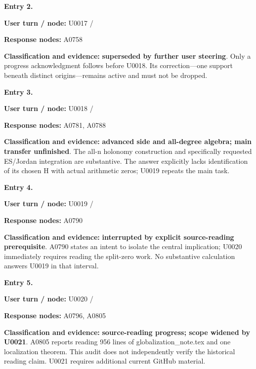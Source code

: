 
\textbf{Entry 2.}

\textbf{User turn / node:} U0017 /
\protect{}

\textbf{Response nodes:} A0758

\textbf{Classification and evidence:} \textbf{superseded by further user
steering}. Only a progress acknowledgment follows before U0018. Its
correction---one support beneath distinct origins---remains active and
must not be dropped.


\textbf{Entry 3.}

\textbf{User turn / node:} U0018 /
\protect{}

\textbf{Response nodes:} A0781, A0788

\textbf{Classification and evidence:} \textbf{advanced side and
all-degree algebra; main transfer unfinished}. The all-n holonomy
construction and specifically requested ES/Jordan integration are
substantive. The answer explicitly lacks identification of its chosen H
with actual arithmetic zeros; U0019 repeats the main task.


\textbf{Entry 4.}

\textbf{User turn / node:} U0019 /
\protect{}

\textbf{Response nodes:} A0790

\textbf{Classification and evidence:} \textbf{interrupted by explicit
source-reading prerequisite}. A0790 states an intent to isolate the
central implication; U0020 immediately requires reading the split-zero
work. No substantive calculation answers U0019 in that interval.


\textbf{Entry 5.}

\textbf{User turn / node:} U0020 /
\protect{}

\textbf{Response nodes:} A0796, A0805

\textbf{Classification and evidence:} \textbf{source-reading progress;
scope widened by U0021}. A0805 reports reading 956 lines of
globalization\_note.tex and one localization theorem. This audit does
not independently verify the historical reading claim. U0021 requires
additional current GitHub material.


